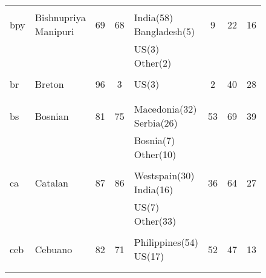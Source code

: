 \begin{figure}[h]
\begin{tabular}{llcclccc}
&&&&&&&\\
bpy&Bishnupriya Manipuri&69&68&India(58) Bangladesh(5) &9&22&16\\
&&&&US(3) Other(2) &&&\\
&&&&&&&\\
br&Breton&96&3&US(3) &2&40&28\\
&&&&&&&\\
&&&&&&&\\
bs&Bosnian&81&75&Macedonia(32) Serbia(26) &53&69&39\\
&&&&Bosnia(7) Other(10) &&&\\
&&&&&&&\\
ca&Catalan&87&86&Westspain(30) India(16) &36&64&27\\
&&&&US(7) Other(33) &&&\\
&&&&&&&\\
ceb&Cebuano&82&71&Philippines(54) US(17) &52&47&13\\
&&&&&&&\\
&&&&&&&\\
\end{tabular}
\end{figure}
\clearpage
